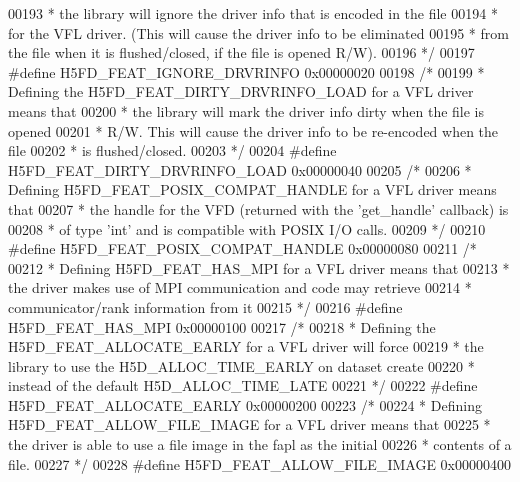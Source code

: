 \begin{DoxyCode}
00193 \textcolor{comment}{     * the library will ignore the driver info that is encoded in the file}
00194 \textcolor{comment}{     * for the VFL driver.  (This will cause the driver info to be eliminated}
00195 \textcolor{comment}{     * from the file when it is flushed/closed, if the file is opened R/W).}
00196 \textcolor{comment}{     */}
00197 \textcolor{preprocessor}{#define H5FD\_FEAT\_IGNORE\_DRVRINFO       0x00000020}
00198     \textcolor{comment}{/*}
00199 \textcolor{comment}{     * Defining the H5FD\_FEAT\_DIRTY\_DRVRINFO\_LOAD for a VFL driver means that}
00200 \textcolor{comment}{     * the library will mark the driver info dirty when the file is opened}
00201 \textcolor{comment}{     * R/W.  This will cause the driver info to be re-encoded when the file}
00202 \textcolor{comment}{     * is flushed/closed.}
00203 \textcolor{comment}{     */}
00204 \textcolor{preprocessor}{#define H5FD\_FEAT\_DIRTY\_DRVRINFO\_LOAD   0x00000040}
00205     \textcolor{comment}{/*}
00206 \textcolor{comment}{     * Defining H5FD\_FEAT\_POSIX\_COMPAT\_HANDLE for a VFL driver means that}
00207 \textcolor{comment}{     * the handle for the VFD (returned with the 'get\_handle' callback) is}
00208 \textcolor{comment}{     * of type 'int' and is compatible with POSIX I/O calls.}
00209 \textcolor{comment}{     */}
00210 \textcolor{preprocessor}{#define H5FD\_FEAT\_POSIX\_COMPAT\_HANDLE   0x00000080    }
00211     \textcolor{comment}{/*}
00212 \textcolor{comment}{     * Defining H5FD\_FEAT\_HAS\_MPI for a VFL driver means that}
00213 \textcolor{comment}{     * the driver makes use of MPI communication and code may retrieve}
00214 \textcolor{comment}{     * communicator/rank information from it}
00215 \textcolor{comment}{     */}
00216 \textcolor{preprocessor}{#define H5FD\_FEAT\_HAS\_MPI               0x00000100}
00217     \textcolor{comment}{/*}
00218 \textcolor{comment}{     * Defining the H5FD\_FEAT\_ALLOCATE\_EARLY for a VFL driver will force}
00219 \textcolor{comment}{     * the library to use the H5D\_ALLOC\_TIME\_EARLY on dataset create}
00220 \textcolor{comment}{     * instead of the default H5D\_ALLOC\_TIME\_LATE}
00221 \textcolor{comment}{     */}
00222 \textcolor{preprocessor}{#define H5FD\_FEAT\_ALLOCATE\_EARLY        0x00000200}
00223     \textcolor{comment}{/* }
00224 \textcolor{comment}{     * Defining H5FD\_FEAT\_ALLOW\_FILE\_IMAGE for a VFL driver means that}
00225 \textcolor{comment}{     * the driver is able to use a file image in the fapl as the initial}
00226 \textcolor{comment}{     * contents of a file.}
00227 \textcolor{comment}{     */}
00228 \textcolor{preprocessor}{#define H5FD\_FEAT\_ALLOW\_FILE\_IMAGE      0x00000400}

\end{DoxyCode}
